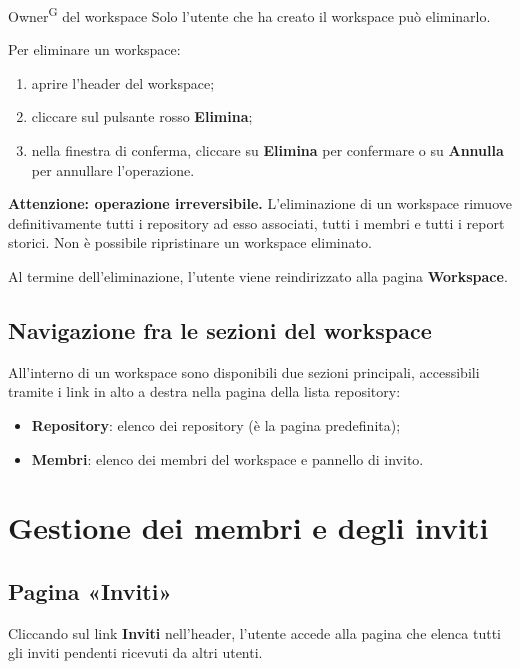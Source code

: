 \documentclass[a4paper, 11pt]{article}
\begin{document}
\begin{rolebox}{Owner\textsuperscript{G} del workspace}
Solo l'utente che ha creato il workspace può eliminarlo.
\end{rolebox}

Per eliminare un workspace:
\begin{enumerate}
    \item aprire l'header del workspace;
    \item cliccare sul pulsante rosso \textbf{Elimina};
    \item nella finestra di conferma, cliccare su \textbf{Elimina} per confermare o su \textbf{Annulla} per annullare l'operazione.
\end{enumerate}

\begin{warnbox}
\textbf{Attenzione: operazione irreversibile.} L'eliminazione di un workspace rimuove definitivamente tutti i repository ad esso associati, tutti i membri e tutti i report storici. Non è possibile ripristinare un workspace eliminato.
\end{warnbox}

\noindent Al termine dell'eliminazione, l'utente viene reindirizzato alla pagina \textbf{Workspace}.

\subsection{Navigazione fra le sezioni del workspace}
All'interno di un workspace sono disponibili due sezioni principali, accessibili tramite i link in alto a destra nella pagina della lista repository:
\begin{itemize}
    \item \textbf{Repository}: elenco dei repository (è la pagina predefinita);
    \item \textbf{Membri}: elenco dei membri del workspace e pannello di invito.
\end{itemize}

\newpage
\section{Gestione dei membri e degli inviti}

\subsection{Pagina «Inviti»}
Cliccando sul link \textbf{Inviti} nell'header, l'utente accede alla pagina che elenca tutti gli inviti pendenti ricevuti da altri utenti.
\end{document}
